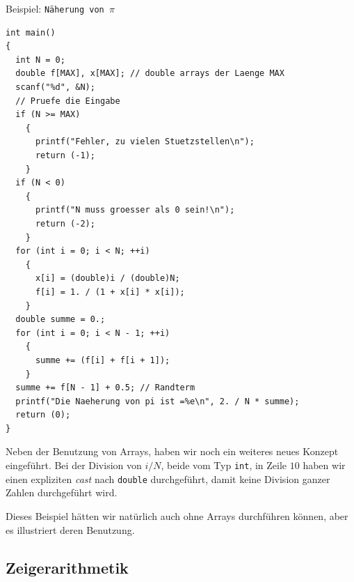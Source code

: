 \begin{myexampleprogram}{Beispiel: \texttt{Näherung von $\pi$}}
\begin{lstlisting}
int main()
{
  int N = 0;
  double f[MAX], x[MAX]; // double arrays der Laenge MAX
  scanf("%d", &N);
  // Pruefe die Eingabe
  if (N >= MAX)
    {
      printf("Fehler, zu vielen Stuetzstellen\n");
      return (-1);
    }
  if (N < 0)
    {
      printf("N muss groesser als 0 sein!\n");
      return (-2);
    }
  for (int i = 0; i < N; ++i)
    {
      x[i] = (double)i / (double)N;
      f[i] = 1. / (1 + x[i] * x[i]);
    }
  double summe = 0.;
  for (int i = 0; i < N - 1; ++i)
    {
      summe += (f[i] + f[i + 1]);
    }
  summe += f[N - 1] + 0.5; // Randterm
  printf("Die Naeherung von pi ist =%e\n", 2. / N * summe);
  return (0);
}
\end{lstlisting}
  Neben der Benutzung von Arrays, haben wir noch ein weiteres neues Konzept eingeführt.
  Bei der Division von $i/N$, beide vom Typ \verb|int|, in Zeile $10$ haben wir einen expliziten \emph{cast} nach \verb|double| durchgeführt, damit keine Division ganzer Zahlen durchgeführt wird.

  Dieses Beispiel hätten wir natürlich auch ohne Arrays durchführen können, aber es illustriert deren Benutzung.
\end{myexampleprogram}

\subsection{Zeigerarithmetik}

